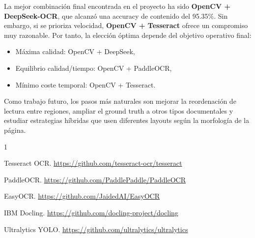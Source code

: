\documentclass[11pt, a4paper]{article}
\begin{document}
La mejor combinaci\'on final encontrada en el proyecto ha sido \textbf{OpenCV + DeepSeek-OCR},
que alcanz\'o una accuracy de contenido del 95.35\%. Sin embargo, si se prioriza velocidad,
\textbf{OpenCV + Tesseract} ofrece un compromiso muy razonable. Por tanto, la elecci\'on \'optima
depende del objetivo operativo final:

\begin{itemize}
    \item M\'axima calidad: OpenCV + DeepSeek,
    \item Equilibrio calidad/tiempo: OpenCV + PaddleOCR,
    \item M\'inimo coste temporal: OpenCV + Tesseract.
\end{itemize}

Como trabajo futuro, los pasos m\'as naturales son mejorar la reordenaci\'on de lectura entre
regiones, ampliar el ground truth a otros tipos documentales y estudiar estrategias h\'ibridas
que usen diferentes layouts seg\'un la morfolog\'ia de la p\'agina.

\begin{thebibliography}{1}

Tesseract OCR. \url{https://github.com/tesseract-ocr/tesseract}

PaddleOCR. \url{https://github.com/PaddlePaddle/PaddleOCR}

EasyOCR. \url{https://github.com/JaidedAI/EasyOCR}

IBM Docling. \url{https://github.com/docling-project/docling}

Ultralytics YOLO. \url{https://github.com/ultralytics/ultralytics}

\end{thebibliography}
\end{document}
